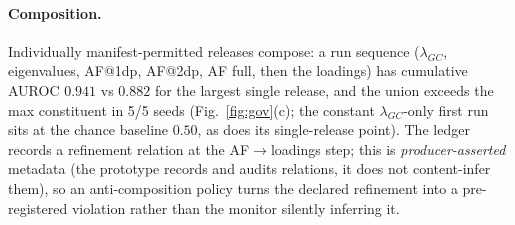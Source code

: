 \documentclass[11pt]{article}
\begin{document}
\paragraph{Composition.} Individually manifest-permitted releases compose: a run
sequence ($\lambda_{GC}$, eigenvalues, AF@1dp, AF@2dp, AF full, then the
loadings) has cumulative AUROC $0.941$ vs $0.882$ for the largest single release,
and the union exceeds the max constituent in 5/5 seeds (Fig.~\ref{fig:gov}(c);
the constant $\lambda_{GC}$-only first run sits at the chance baseline $0.50$, as
does its single-release point).
The ledger records a refinement relation at the AF$\to$loadings step; this is
\emph{producer-asserted} metadata (the prototype records and audits relations,
it does not content-infer them), so an anti-composition policy turns the declared
refinement into a pre-registered violation rather than the monitor silently
inferring it.
\end{document}

